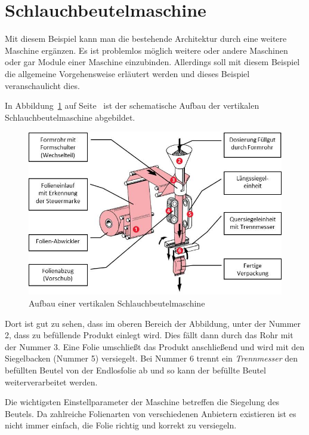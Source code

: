 \section{Schlauchbeutelmaschine}
Mit diesem Beispiel kann man die bestehende Architektur durch eine weitere Maschine ergänzen. Es ist problemlos möglich
weitere oder andere Maschinen oder gar Module einer Maschine einzubinden. Allerdings soll mit diesem Beispiel die
allgemeine Vorgehensweise erläutert werden und dieses Beispiel veranschaulicht dies.

In Abbildung~\ref{fig:siegelmaschinen_vffs} auf Seite~\pageref{fig:siegelmaschinen_vffs} ist der schematische Aufbau der
vertikalen Schlauchbeutelmaschine abgebildet.

\begin{figure}[h]
    \centering
    \includegraphics[scale=1]{images/kapitel_5/vffs.jpg}
    \caption{Aufbau einer vertikalen Schlauchbeutelmaschine~\cite{online_grundlagen_boschkwe}}
    \label{fig:siegelmaschinen_vffs}
\end{figure}

Dort ist gut zu sehen, dass im oberen Bereich der Abbildung, unter der Nummer 2, dass zu befüllende Produkt einlegt
wird. Dies fällt dann durch das Rohr mit der Nummer 3. Eine Folie umschließt das Produkt anschließend und wird mit den
Siegelbacken (Nummer 5) versiegelt. Bei Nummer 6 trennt ein \textit{Trennmesser} den befüllten Beutel von der
Endlosfolie ab und so kann der befüllte Beutel weiterverarbeitet werden.

Die wichtigsten Einstellparameter der Maschine betreffen die Siegelung des Beutels. Da zahlreiche Folienarten von
verschiedenen Anbietern existieren ist es nicht immer einfach, die Folie richtig und korrekt zu versiegeln.

